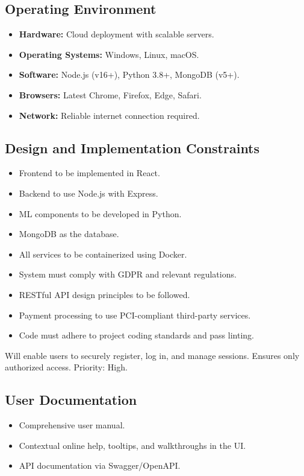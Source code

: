 \documentclass[11pt,a4paper]{article}
\begin{document}
\subsection{Operating Environment}
\begin{itemize}
    \item \textbf{Hardware:} Cloud deployment with scalable servers.
    \item \textbf{Operating Systems:} Windows, Linux, macOS.
    \item \textbf{Software:} Node.js (v16+), Python 3.8+, MongoDB (v5+).
    \item \textbf{Browsers:} Latest Chrome, Firefox, Edge, Safari.
    \item \textbf{Network:} Reliable internet connection required.
\end{itemize}

\subsection{Design and Implementation Constraints}
\begin{itemize}
    \item Frontend to be implemented in React.
    \item Backend to use Node.js with Express.
    \item ML components to be developed in Python.
    \item MongoDB as the database.
    \item All services to be containerized using Docker.
    \item System must comply with GDPR and relevant regulations.
    \item RESTful API design principles to be followed.
    \item Payment processing to use PCI-compliant third-party services.
    \item Code must adhere to project coding standards and pass linting.
\end{itemize}
Will enable users to securely register, log in, and manage sessions. Ensures only authorized access. Priority: High.
\subsection{User Documentation}
\begin{itemize}
    \item Comprehensive user manual.
    \item Contextual online help, tooltips, and walkthroughs in the UI.
    \item API documentation via Swagger/OpenAPI.
\end{itemize}
\end{document}
